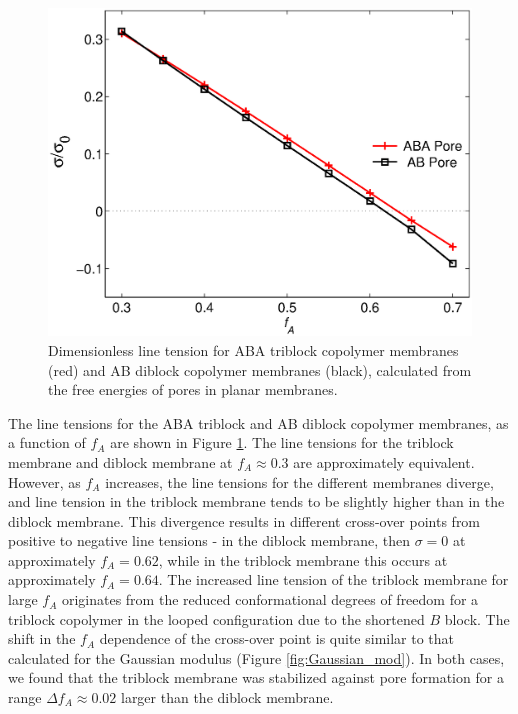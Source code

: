 \documentclass[twocolumn,aps,floatfix,nobibnotes]{revtex4-1}
\begin{document}
\begin{figure}[htp]
\centering
\includegraphics[width=1.0\columnwidth]{line_tension}
\caption{Dimensionless line tension for ABA triblock copolymer membranes (red) and AB diblock copolymer membranes (black), calculated from the free energies of pores in planar membranes.}
\label{fig:Line_tension}
\centering
\end{figure}

The line tensions for the ABA triblock and AB diblock copolymer membranes, as a function of $f_A$ are shown in Figure \ref{fig:Line_tension}. The line tensions for the triblock membrane and diblock membrane at $f_A \approx 0.3$ are approximately equivalent. However, as $f_A$ increases, the line tensions for the different membranes diverge, and line tension in the triblock membrane tends to be slightly higher than in the diblock membrane. This divergence results in different cross-over points from positive to negative line tensions - in the diblock membrane, then $\sigma = 0$ at approximately $f_A = 0.62$, while in the triblock membrane this occurs at approximately $f_A = 0.64$. The increased line tension of the triblock membrane for large $f_A$ originates from the reduced conformational degrees of freedom for a triblock copolymer in the looped configuration due to the shortened $B$ block. The shift in the $f_A$ dependence of the cross-over point is quite similar to that calculated for the Gaussian modulus (Figure \ref{fig:Gaussian_mod}). In both cases, we found that the triblock membrane was stabilized against pore formation for a range $\Delta f_A \approx 0.02 $ larger than the diblock membrane. 
\end{document}

